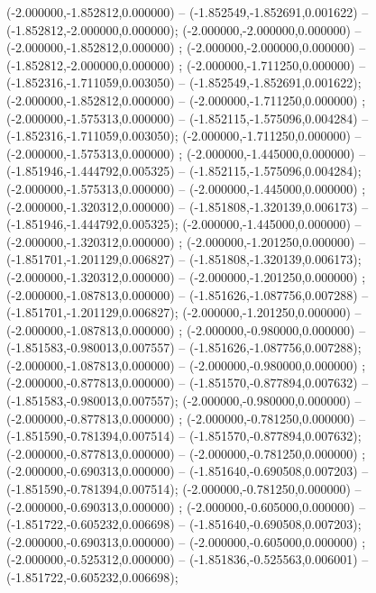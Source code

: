  (-2.000000,-1.852812,0.000000) -- (-1.852549,-1.852691,0.001622) -- (-1.852812,-2.000000,0.000000);
 (-2.000000,-2.000000,0.000000) -- (-2.000000,-1.852812,0.000000) ;
 (-2.000000,-2.000000,0.000000) -- (-1.852812,-2.000000,0.000000) ;
 (-2.000000,-1.711250,0.000000) -- (-1.852316,-1.711059,0.003050) -- (-1.852549,-1.852691,0.001622);
 (-2.000000,-1.852812,0.000000) -- (-2.000000,-1.711250,0.000000) ;
 (-2.000000,-1.575313,0.000000) -- (-1.852115,-1.575096,0.004284) -- (-1.852316,-1.711059,0.003050);
 (-2.000000,-1.711250,0.000000) -- (-2.000000,-1.575313,0.000000) ;
 (-2.000000,-1.445000,0.000000) -- (-1.851946,-1.444792,0.005325) -- (-1.852115,-1.575096,0.004284);
 (-2.000000,-1.575313,0.000000) -- (-2.000000,-1.445000,0.000000) ;
 (-2.000000,-1.320312,0.000000) -- (-1.851808,-1.320139,0.006173) -- (-1.851946,-1.444792,0.005325);
 (-2.000000,-1.445000,0.000000) -- (-2.000000,-1.320312,0.000000) ;
 (-2.000000,-1.201250,0.000000) -- (-1.851701,-1.201129,0.006827) -- (-1.851808,-1.320139,0.006173);
 (-2.000000,-1.320312,0.000000) -- (-2.000000,-1.201250,0.000000) ;
 (-2.000000,-1.087813,0.000000) -- (-1.851626,-1.087756,0.007288) -- (-1.851701,-1.201129,0.006827);
 (-2.000000,-1.201250,0.000000) -- (-2.000000,-1.087813,0.000000) ;
 (-2.000000,-0.980000,0.000000) -- (-1.851583,-0.980013,0.007557) -- (-1.851626,-1.087756,0.007288);
 (-2.000000,-1.087813,0.000000) -- (-2.000000,-0.980000,0.000000) ;
 (-2.000000,-0.877813,0.000000) -- (-1.851570,-0.877894,0.007632) -- (-1.851583,-0.980013,0.007557);
 (-2.000000,-0.980000,0.000000) -- (-2.000000,-0.877813,0.000000) ;
 (-2.000000,-0.781250,0.000000) -- (-1.851590,-0.781394,0.007514) -- (-1.851570,-0.877894,0.007632);
 (-2.000000,-0.877813,0.000000) -- (-2.000000,-0.781250,0.000000) ;
 (-2.000000,-0.690313,0.000000) -- (-1.851640,-0.690508,0.007203) -- (-1.851590,-0.781394,0.007514);
 (-2.000000,-0.781250,0.000000) -- (-2.000000,-0.690313,0.000000) ;
 (-2.000000,-0.605000,0.000000) -- (-1.851722,-0.605232,0.006698) -- (-1.851640,-0.690508,0.007203);
 (-2.000000,-0.690313,0.000000) -- (-2.000000,-0.605000,0.000000) ;
 (-2.000000,-0.525312,0.000000) -- (-1.851836,-0.525563,0.006001) -- (-1.851722,-0.605232,0.006698);
